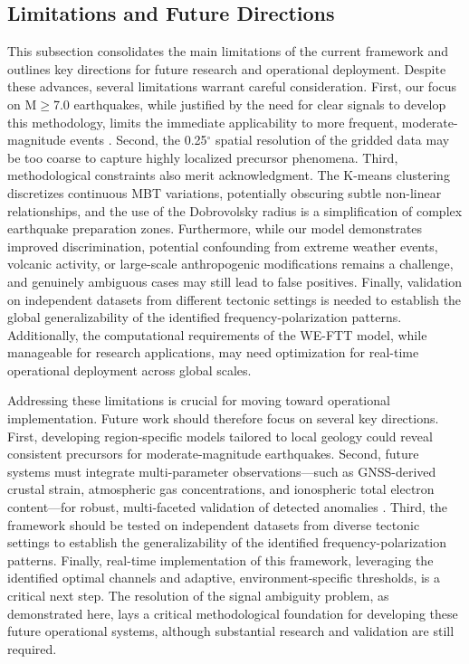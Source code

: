 \documentclass[preprint,review,12pt,authoryear]{elsarticle}
\begin{document}
\subsection{Limitations and Future Directions}\label{sec:discuss_limitations}
This subsection consolidates the main limitations of the current framework and outlines key directions for future research and operational deployment. Despite these advances, several limitations warrant careful consideration. First, our focus on M$\ge$7.0 earthquakes, while justified by the need for clear signals to develop this methodology, limits the immediate applicability to more frequent, moderate-magnitude events \citep{jingLandAtmosphereMeteorological2019}. Second, the 0.25$^{\circ}$ spatial resolution of the gridded data may be too coarse to capture highly localized precursor phenomena. Third, methodological constraints also merit acknowledgment. The K-means clustering discretizes continuous MBT variations, potentially obscuring subtle non-linear relationships, and the use of the Dobrovolsky radius is a simplification of complex earthquake preparation zones. Furthermore, while our model demonstrates improved discrimination, potential confounding from extreme weather events, volcanic activity, or large-scale anthropogenic modifications remains a challenge, and genuinely ambiguous cases may still lead to false positives. Finally, validation on independent datasets from different tectonic settings is needed to establish the global generalizability of the identified frequency-polarization patterns. Additionally, the computational requirements of the WE-FTT model, while manageable for research applications, may need optimization for real-time operational deployment across global scales.


Addressing these limitations is crucial for moving toward operational implementation. Future work should therefore focus on several key directions. First, developing region-specific models tailored to local geology could reveal consistent precursors for moderate-magnitude earthquakes. Second, future systems must integrate multi-parameter observations---such as GNSS-derived crustal strain, atmospheric gas concentrations, and ionospheric total electron content---for robust, multi-faceted validation of detected anomalies \citep{hayakawaIntegratedAnalysisMultiParameter2024}. Third, the framework should be tested on independent datasets from diverse tectonic settings to establish the generalizability of the identified frequency-polarization patterns. Finally, real-time implementation of this framework, leveraging the identified optimal channels and adaptive, environment-specific thresholds, is a critical next step. The resolution of the signal ambiguity problem, as demonstrated here, lays a critical methodological foundation for developing these future operational systems, although substantial research and validation are still required.
\end{document}

